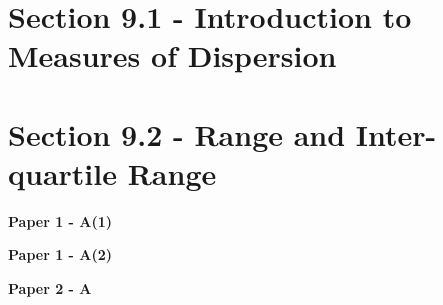 \documentclass[12pt, a4paper]{article}
\begin{document}
\section*{Section 9.1 - Introduction to Measures of Dispersion}\label{section:5-9-1}





\section*{Section 9.2 - Range and Inter-quartile Range}\label{section:5-9-2}

\textbf{Paper 1 - A(1)}
\begin{enumx}[label=\arabic*.,start=1]
\item {}\label{DSE2012P-CoreP1-Q09} 
\end{enumx}
\textbf{Paper 1 - A(2)}
\begin{enumx}[label=\arabic*.,start=2]
\item {}\label{DSE2015-CoreP1-Q12} 
\item {}\label{DSE2016-CoreP1-Q12} 
\item {}\label{DSE2020-CoreP1-Q11} 
\item {}\label{DSE2024-CoreP1-Q11} 
\end{enumx}
\textbf{Paper 2 - A}
\begin{enumx}[label=\arabic*.,start=6]
\item {}\label{DSE2014-CoreP2-Q30} 
\item {}\label{DSE2017-CoreP2-Q30} 
\item {}\label{DSE2018-CoreP2-Q30} 
\item {}\label{DSE2019-CoreP2-Q30} 
\item {}\label{DSE2020-CoreP2-Q29} 
\item {}\label{DSE2021-CoreP2-Q29} 
\item {}\label{DSE2022-CoreP2-Q30} 
\end{enumx}
\end{document}
